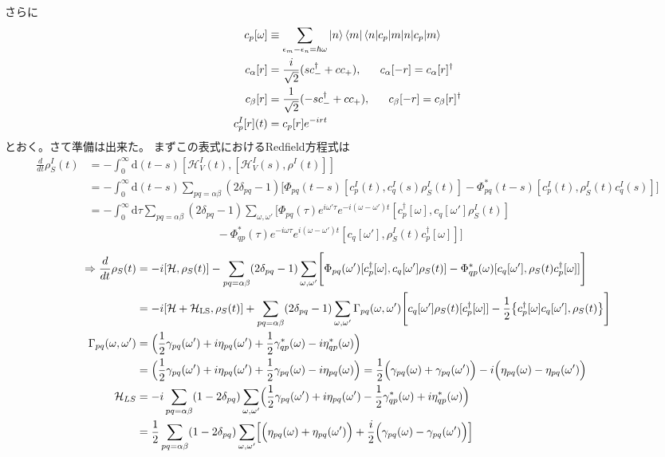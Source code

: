 \documentclass[dvipdfmx,autodetect-engine]{jsarticle}
\newcommand{\da}{\dagger}
\newcommand{\m}[1]{\mathcal{#1}}
\newcommand{\mr}[1]{\mathrm{#1}}
\newcommand{\bv}[1]{\Bigl(#1\Bigr)}
\newcommand{\bg}[1]{\Bigl[#1\Bigr]}
\begin{document}
さらに
\begin{align}
    c_p[\omega] &\equiv \sum_{\epsilon_m-\epsilon_n = \hbar\omega}\ket{n}\bra{m}\braket{n|c_p|m}\\
    c_\alpha[r] &= \frac{i}{\sqrt{2}}(sc^\da_- + c c_+), \ \ \ \ \ c_\alpha[-r] = c_\alpha[r]^\da\\
    c_\beta[r] &= \frac{1}{\sqrt{2}}(-sc^\da_- + c c_+), \ \ \ \ \ c_\beta[-r] = c_\beta[r]^\da\\
    c^I_p[r](t) &= c_p[r] e^{-irt}
\end{align}
とおく。さて準備は出来た。
まずこの表式におけるRedfield方程式は
\begin{align}
    \frac{d}{dt}\rho^I_S(t) &= -\int_0^\infty \mr{d}(t-s) [\m{H}^I_V(t),[\m{H}^I_V(s), \rho^I(t)]]\\
    &= -\int_0^\infty \mr{d}(t-s)\sum_{pq = \alpha\beta}(2\delta_{pq}-1)\Biggl[\Phi_{pq}(t-s)[c^I_{p}(t), c^I_q(s)\rho^I_S(t)] - \Phi^*_{pq}(t-s)[c^I_{p}(t), \rho^I_S(t)c^I_q(s)]\Biggr]\\
    &= -\int_0^\infty \mr{d}\tau\sum_{pq = \alpha\beta}(2\delta_{pq}-1)\sum_{\omega, \omega'}\Biggl[\Phi_{pq}(\tau)e^{i\omega'\tau}e^{-i(\omega-\omega')t}[c^\da_{p}[\omega], c_q[\omega']\rho^I_S(t)]\nonumber\\
    & \ \ \ \ \ \ \ \ \ \ \ \ \ \ \ \ \ \ \ \ \ \ \ \ \ \ \ \ \ \ \ \ \ \ \ \ \ \ \ \ \ \ \ \ \ \ \ \ \ \ \ \ - \Phi^*_{qp}(\tau)e^{-i\omega\tau}e^{i(\omega-\omega')t}[c_{q}[\omega'], \rho^I_S(t)c^\da_p[\omega]]\Biggr]
\end{align}
\begin{align}
    \Rightarrow \frac{d}{dt}\rho_S(t) &= -i[\m{H}, \rho_S(t)] - \sum_{pq = \alpha\beta}(2\delta_{pq}-1)\sum_{\omega, \omega'}\Biggl[\Phi_{pq}(\omega')[c^\da_{p}[\omega], c_q[\omega']\rho_S(t)] - \Phi^*_{qp}(\omega)[c_{q}[\omega'], \rho_S(t)c^\da_p[\omega]]\Biggr]\\
    &= -i[\m{H}+\m{H}_{\mr{LS}}, \rho_S(t)] + \sum_{pq = \alpha\beta}(2\delta_{pq}-1)\sum_{\omega, \omega'}\Gamma_{pq}(\omega, \omega')\Biggl[c_q[\omega']\rho_S(t)[c^\da_{p}[\omega]] - \frac{1}{2}\bigl\{c^\da_p[\omega]c_{q}[\omega'], \rho_S(t) \bigr\}\Biggr]\label{RF_normal}\\
    \Gamma_{pq}(\omega, \omega') &= \bv{\frac{1}{2}\gamma_{pq}(\omega') +i\eta_{pq}(\omega') + \frac{1}{2}\gamma_{qp}^*(\omega) -i\eta^*_{qp}(\omega)}\\
    &= \bv{\frac{1}{2}\gamma_{pq}(\omega') +i\eta_{pq}(\omega') + \frac{1}{2}\gamma_{pq}(\omega) -i\eta_{pq}(\omega)} = \frac{1}{2}\bv{\gamma_{pq}(\omega) + \gamma_{pq}(\omega')} -i\bv{\eta_{pq}(\omega)-\eta_{pq}(\omega')}\\
    \m{H}_{LS}& =  -i\sum_{pq = \alpha\beta}(1-2\delta_{pq})\sum_{\omega, \omega'}\bv{\frac{1}{2}\gamma_{pq}(\omega') +i\eta_{pq}(\omega') - \frac{1}{2}\gamma_{qp}^*(\omega) +i\eta^*_{qp}(\omega)}\\
    & =  \frac{1}{2}\sum_{pq = \alpha\beta}(1-2\delta_{pq})\sum_{\omega, \omega'}\bg{\bv{\eta_{pq}(\omega) + \eta_{pq}(\omega')} +\frac{i}{2}\bv{\gamma_{pq}(\omega)-\gamma_{pq}(\omega')}}
\end{align}
\end{document}
